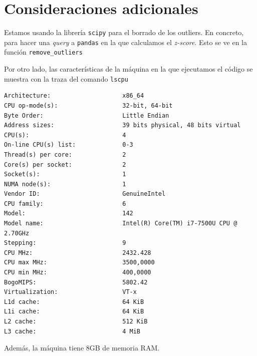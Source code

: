 \documentclass[11pt]{article}
\begin{document}
\pagebreak

\section{Consideraciones adicionales} \label{consideraciones}

Estamos usando la librería \lstinline{scipy} para el borrado de los outliers. En concreto, para hacer una \emph{query} a \lstinline{pandas} en la que calculamos el \emph{z-score}. Esto se ve en la función \lstinline{remove_outliers}

Por otro lado, las características de la máquina en la que ejecutamos el código se muestra con la traza del comando \lstinline{lscpu}

\begin{lstlisting}
Architecture:                    x86_64
CPU op-mode(s):                  32-bit, 64-bit
Byte Order:                      Little Endian
Address sizes:                   39 bits physical, 48 bits virtual
CPU(s):                          4
On-line CPU(s) list:             0-3
Thread(s) per core:              2
Core(s) per socket:              2
Socket(s):                       1
NUMA node(s):                    1
Vendor ID:                       GenuineIntel
CPU family:                      6
Model:                           142
Model name:                      Intel(R) Core(TM) i7-7500U CPU @ 2.70GHz
Stepping:                        9
CPU MHz:                         2432.428
CPU max MHz:                     3500,0000
CPU min MHz:                     400,0000
BogoMIPS:                        5802.42
Virtualization:                  VT-x
L1d cache:                       64 KiB
L1i cache:                       64 KiB
L2 cache:                        512 KiB
L3 cache:                        4 MiB
\end{lstlisting}

Además, la máquina tiene 8GB de memoria RAM.


\pagebreak


\end{document}
